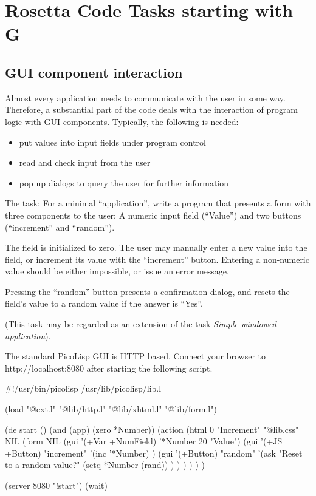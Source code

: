 %
%
%

\chapter{Rosetta Code Tasks starting with G}

\section*{GUI component interaction}

Almost every application needs to communicate with the user in some way.
Therefore, a substantial part of the code deals with the interaction of
program logic with GUI components. Typically, the following is needed:

\begin{itemize}
\item
  put values into input fields under program control
\item
  read and check input from the user
\item
  pop up dialogs to query the user for further information
\end{itemize}

The task: For a minimal ``application'', write a program that presents a
form with three components to the user: A numeric input field
(``Value'') and two buttons (``increment'' and ``random'').

The field is initialized to zero. The user may manually enter a new
value into the field, or increment its value with the ``increment''
button. Entering a non-numeric value should be either impossible, or
issue an error message.

Pressing the ``random'' button presents a confirmation dialog, and
resets the field's value to a random value if the answer is ``Yes''.

(This task may be regarded as an extension of the task \emph{Simple
  windowed application}).


\begin{wideverbatim}

The standard PicoLisp GUI is HTTP based. Connect your browser to
http://localhost:8080 after starting the following script.

#!/usr/bin/picolisp /usr/lib/picolisp/lib.l

(load "@ext.l" "@lib/http.l" "@lib/xhtml.l" "@lib/form.l")

(de start ()
   (and (app) (zero *Number))
   (action
      (html 0 "Increment" "@lib.css" NIL
         (form NIL
            (gui '(+Var +NumField) '*Number 20 "Value")
            (gui '(+JS +Button) "increment"
               '(inc '*Number) )
            (gui '(+Button) "random"
               '(ask "Reset to a random value?"
                  (setq *Number (rand)) ) ) ) ) ) )

(server 8080 "!start")
(wait)

\end{wideverbatim}

